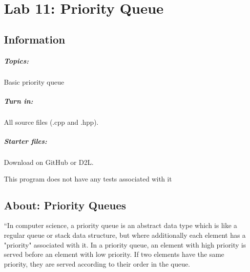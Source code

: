 \documentclass[a4paper,12pt,oneside]{book}
\title{}
\author{Rachel Morris}
\date{\today}
\newcommand{\laLab}{Lab 11: Priority Queue\ }
\begin{document}
    \chapter*{\laLab} 

        \section{Information}
            \paragraph{ Topics: } Basic priority queue
            \paragraph{ Turn in: } All source files (.cpp and .hpp).
            \paragraph{ Starter files: } Download on GitHub or D2L.
            





\renewcommand*\DTstylecomment{\rmfamily\color{green}\textsc}

\begin{framed}
\end{framed}

This program does not have any tests associated with it


    \section{About: Priority Queues}

        ``In computer science, a priority queue is an abstract data type which is like a regular queue or stack data structure, but where additionally each element has a "priority" associated with it. In a priority queue, an element with high priority is served before an element with low priority. If two elements have the same priority, they are served according to their order in the queue.
\end{document}
